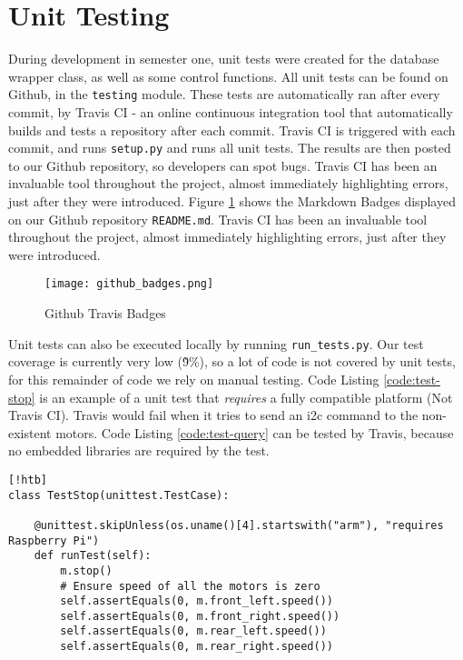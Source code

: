 \section{Unit Testing}
\label{sec:unit-testing}
\pagestyle{cameron}

During development in semester one, unit tests were created for the database wrapper class, as well as some control functions. All unit tests can be found on Github, in the \texttt{testing} module. These tests are automatically ran after every commit, by Travis \gls{CI} - an online continuous integration tool that automatically builds and tests a repository after each commit.
\newline
Travis \gls{CI} is triggered with each commit, and runs \texttt{setup.py} and runs all unit tests. The results are then posted to our Github repository, so developers can spot bugs. Travis CI has been an invaluable tool throughout the project, almost immediately highlighting errors, just after they were introduced.
\newline
Figure \ref{fig:github-badges} shows the Markdown Badges displayed on our Github repository \texttt{README.md}. Travis CI has been an invaluable tool throughout the project, almost immediately highlighting errors, just after they were introduced.

\begin{figure}[!htb]
\begin{center}
\texttt{[image: github\_badges.png]}
\end{center}
\caption{Github Travis Badges}
\label{fig:github-badges}
\end{figure}
\noindent
Unit tests can also be executed locally by running \texttt{run\_tests.py}. Our test coverage is currently very low (\~9\%), so a lot of code is not covered by unit tests, for this remainder of code we rely on manual testing.
\newline
Code Listing \ref{code:test-stop} is an example of a unit test that \textit{requires} a fully compatible platform (Not Travis CI). Travis would fail when it tries to send an \gls{i2c} command to the non-existent motors.  Code Listing \ref{code:test-query} can be tested by Travis, because no embedded libraries are required by the test.

\begin{lstlisting}[style=custompython,label=code:test-stop][!htb]
class TestStop(unittest.TestCase):

    @unittest.skipUnless(os.uname()[4].startswith("arm"), "requires Raspberry Pi")
    def runTest(self):
        m.stop()
        # Ensure speed of all the motors is zero
        self.assertEquals(0, m.front_left.speed())
        self.assertEquals(0, m.front_right.speed())
        self.assertEquals(0, m.rear_left.speed())
        self.assertEquals(0, m.rear_right.speed())
\end{lstlisting}

